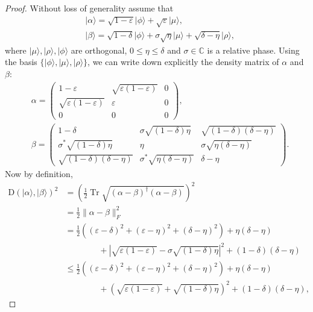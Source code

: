 \documentclass[10pt,a4paper]{article}
\theoremstyle{remark}
\def\epsilon{\varepsilon}
\newcommand{\C}{{\mathbb C}}
\newcommand{\1}[1]{\mathds{1}{[#1]}}
\newcommand{\ket}[1]{\lvert #1\rangle}
\newcommand{\trace}{\operatorname{Tr}}
\newcommand{\TD}{\mathrm{D}}
\numberwithin{equation}{section}
\begin{document}
\begin{proof}
Without loss of generality assume that
\begin{align}
    &\ket\alpha = \sqrt{1-\epsilon}\ket\phi + \sqrt\epsilon \ket \mu, 
    \nonumber\\
    &\ket\beta = \sqrt{1-\delta}\ket\phi + \sigma\sqrt\eta\ket\mu + \sqrt{\delta-\eta}\ket\rho,
    \nonumber
\end{align}
where $\ket\mu, \ket\rho, \ket\phi$ are orthogonal, $0\le\eta\le \delta$ and $\sigma\in \C$ is a relative phase. Using the basis $\{\ket\phi, \ket\mu, \ket\rho\}$, we can write down explicitly the density matrix of $\alpha$ and $\beta$:
\begin{align*}
&\alpha = \begin{pmatrix}
    1-\epsilon & \sqrt{\epsilon(1-\epsilon)} & 0 \\
    \sqrt{\epsilon(1-\epsilon)} & \epsilon & 0\\
    0 & 0&0
\end{pmatrix},
%
\\
&\beta = \begin{pmatrix}
    1-\delta   &   \sigma\sqrt{(1-\delta)\eta}  &  
 \sqrt{(1-\delta)(\delta-\eta)} \\
    \sigma^* \sqrt{(1-\delta)\eta} &   \eta    &   \sigma\sqrt{\eta(\delta-\eta)}\\
    \sqrt{(1-\delta)(\delta-\eta)} &   \sigma^*\sqrt{\eta(\delta-\eta)} & \delta-\eta
\end{pmatrix}.
\end{align*}
Now by definition, 
\begin{align}
    \TD(\ket\alpha, \ket\beta) ^2
    &= \left(\frac{1}{2}\trace\sqrt{(\alpha - \beta)^\dagger (\alpha-\beta)}\right)^2
       \nonumber \\
    &= \frac{1}{2} \|\alpha-\beta\|_F^2
        \nonumber\\
    &= \frac{1}{2}( (\epsilon-\delta)^2 + (\epsilon-\eta)^2 + (\delta-\eta)^2 )
        +\eta(\delta-\eta) 
        \nonumber \\
    &\qquad\qquad + |\sqrt{\epsilon(1-\epsilon)}-\sigma\sqrt{(1-\delta)\eta}|^2 +(1-\delta)(\delta-\eta) 
        \nonumber\\
    &\le \frac{1}{2}( (\epsilon-\delta)^2 + (\epsilon-\eta)^2 + (\delta-\eta)^2 )
        +\eta(\delta-\eta) 
        \nonumber \\
    &\qquad\qquad + (\sqrt{\epsilon(1-\epsilon)}+\sqrt{(1-\delta)\eta})^2 +(1-\delta)(\delta-\eta), \label{eq:trace-triangle-bound}
\end{align}

\end{proof}
\end{document}
